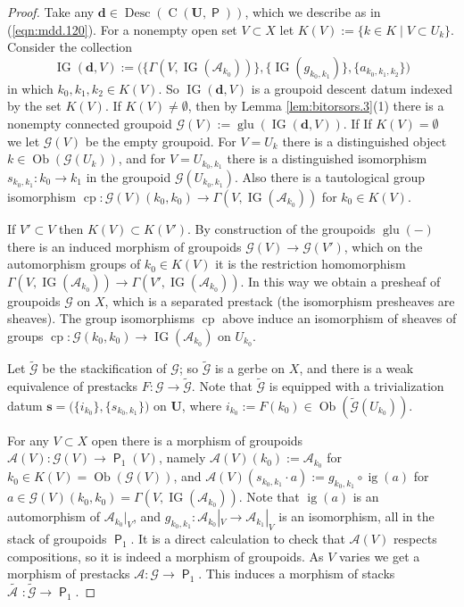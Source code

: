 \documentclass[a4paper, 10pt]{amsart}
\theoremstyle{definition}
\numberwithin{equation}{section}
\newcommand{\opn}{\operatorname}
\newcommand{\cat}[1]{\operatorname{\mathsf{#1}}}
\newcommand{\mcal}[1]{\mathcal{#1}}
\newcommand{\bsym}[1]{\boldsymbol{#1}}
\newcommand{\til}[1]{\tilde{#1}}
\newcommand{\gerbe}[1]{\bsym{\mcal{#1}}}
\newcommand{\twocat}[1]{\operatorname{\bsym{\cat{#1}}}}
\begin{document}
\begin{proof}
Take any $\bsym{d} \in \opn{Desc}(\opn{C}(\bsym{U}, \twocat{P}))$, which we
describe as in (\ref{eqn:mdd.120}).
For a nonempty open set $V \subset X$ let 
$K(V) := \{ k \in K \mid V \subset U_k \}$. 
Consider the collection 
\[ \opn{IG}(\bsym{d}, V) := 
\bigl( \{ \Gamma(V, \opn{IG}(\mcal{A}_{k_0})) \}, 
\{ \opn{IG}(g_{k_0, k_1}) \}, \{ a_{k_0, k_1, k_2} \} \bigr) \]
in which $k_0, k_1, k_2 \in K(V)$. So $\opn{IG}(\bsym{d}, V)$ is a 
groupoid descent datum indexed by the set $K(V)$. 
If $K(V) \neq \emptyset$, then by Lemma \ref{lem:bitorsors.3}(1) there is a
nonempty connected groupoid 
$\gerbe{G}(V) := \opn{glu}(\opn{IG}(\bsym{d}, V))$.
If If $K(V) = \emptyset$ we let $\gerbe{G}(V)$ be the empty groupoid.
For $V = U_k$ there is a distinguished object $k \in \opn{Ob}(\gerbe{G}(U_k))$, 
and for $V = U_{k_0, k_1}$ there is a distinguished isomorphism 
$s_{k_0, k_1} : k_0 \to k_1$ in the groupoid $\gerbe{G}(U_{k_0, k_1})$.
Also there is a tautological group isomorphism 
$\opn{cp} : \gerbe{G}(V)(k_0, k_0) \to 
\Gamma(V, \opn{IG}(\mcal{A}_{k_0}))$
for  $k_0 \in K(V)$.

If $V' \subset V$ then $K(V) \subset K(V')$. 
By construction of the groupoids $\opn{glu}(-)$ there is an induced morphism
of groupoids $\gerbe{G}(V) \to \gerbe{G}(V')$, 
which on the automorphism groups of $k_0 \in K(V)$ it is the restriction
homomorphism
$\Gamma(V, \opn{IG}(\mcal{A}_{k_0})) \to \Gamma(V', \opn{IG}(\mcal{A}_{k_0}))$.
In this way we obtain a presheaf of groupoids $\gerbe{G}$ on $X$, which is a
separated prestack (the isomorphism presheaves are sheaves).
The group isomorphisms $\opn{cp}$ above induce an isomorphism of sheaves of
groups 
$\opn{cp} : \gerbe{G}(k_0, k_0) \to 
\opn{IG}(\mcal{A}_{k_0})$ on $U_{k_0}$.

Let $\til{\gerbe{G}}$ be the stackification of $\gerbe{G}$; so
$\til{\gerbe{G}}$ is a gerbe on $X$, and there is a weak equivalence of
prestacks $F : \gerbe{G} \to \til{\gerbe{G}}$. Note that $\til{\gerbe{G}}$
is equipped with a trivialization datum
$\bsym{s} = \bigl( \{ i_{k_0} \} , \{ s_{k_0, k_1} \} \bigr)$
on $\bsym{U}$,
where $i_{k_0} := F(k_0) \in \opn{Ob}(\til{\gerbe{G}}(U_{k_0}))$.

For any $V \subset X$ open there is a morphism of groupoids 
$\gerbe{A}(V) : \gerbe{G}(V) \to \twocat{P}_1(V)$,
namely $\gerbe{A}(V)(k_0) := \mcal{A}_{k_0}$ for 
$k_0 \in K(V) = \opn{Ob}(\gerbe{G}(V))$,
and
$\gerbe{A}(V)(s_{k_0, k_1} \cdot a) := 
g_{k_0, k_1} \circ \opn{ig}(a)$
for $a \in \gerbe{G}(V)(k_0, k_0) = \Gamma(V, \opn{IG}(\mcal{A}_{k_0}))$.
Note that $\opn{ig}(a)$ is an automorphism of $\mcal{A}_{k_0}|_V$,
and $g_{k_0, k_1} : \mcal{A}_{k_0}|_V \to \mcal{A}_{k_1}|_V$
is an isomorphism, all in the stack of groupoids $\twocat{P}_1$.
It is a direct calculation to check that $\gerbe{A}(V)$ respects compositions,
so it is indeed a morphism of groupoids. 
As $V$ varies we get a morphism of prestacks 
$\gerbe{A} : \gerbe{G} \to \twocat{P}_1$. 
This induces a morphism of stacks 
$\til{\gerbe{A}\, \, } \! \! : \til{\gerbe{G}} \to \twocat{P}_1$.


\end{proof}
\end{document}

